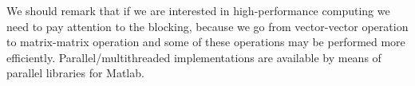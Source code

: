 \documentclass[computational_mathematics.tex]{subfiles}
\begin{document}
\begin{obs}
We should remark that if we are interested in high-performance computing we need to pay attention to the blocking, because we go from vector-vector operation to matrix-matrix operation and some of these operations may be performed more efficiently. Parallel/multithreaded implementations are available by means of parallel libraries for Matlab.
\end{obs}

\end{document}
